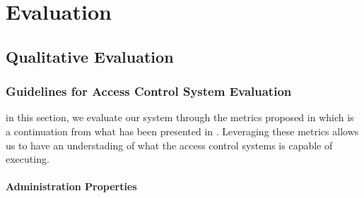 \chapter{Evaluation}

\section{Qualitative Evaluation}

\subsection{Guidelines for Access Control System Evaluation}

in this section, we evaluate our system through the metrics proposed in \cite{hu_guidelines_2012} which is a continuation from what has been presented in \cite{hu_assessment_2006}. Leveraging these metrics allows us to have an understading of what the access control systems is capable of executing.

\subsubsection{Administration Properties}

